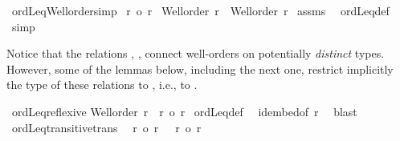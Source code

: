 \begin{isabellebody}
\isanewline
{}\isamarkupfalse%
\ ordLeq{\isacharunderscore}{\kern0pt}Well{\isacharunderscore}{\kern0pt}order{\isacharunderscore}{\kern0pt}simp{\isacharcolon}{\kern0pt}\isanewline
{}\ {\isachardoublequoteopen}r\ {\isasymle}o\ r{\isacharprime}{\kern0pt}{\isachardoublequoteclose}\isanewline
{}\ {\isachardoublequoteopen}Well{\isacharunderscore}{\kern0pt}order\ r\ {\isasymand}\ Well{\isacharunderscore}{\kern0pt}order\ r{\isacharprime}{\kern0pt}{\isachardoublequoteclose}\isanewline
%
\isadelimproof
%
\endisadelimproof
%
\isatagproof
{}\isamarkupfalse%
\ assms\ \isamarkupfalse%
\ ordLeq{\isacharunderscore}{\kern0pt}def\ \isamarkupfalse%
\ simp%
\endisatagproof
{\isafoldproof}%
%
\isadelimproof
%
\endisadelimproof
%
\begin{isamarkuptext}%
Notice that the relations , ,  connect well-orders
on potentially {\em distinct} types. However, some of the lemmas below, including the next one,
restrict implicitly the type of these relations to  , i.e.,
to .%
\end{isamarkuptext}\isamarkuptrue%
\isamarkupfalse%
\ ordLeq{\isacharunderscore}{\kern0pt}reflexive{\isacharcolon}{\kern0pt}\isanewline
{\isachardoublequoteopen}Well{\isacharunderscore}{\kern0pt}order\ r\ {\isasymLongrightarrow}\ r\ {\isasymle}o\ r{\isachardoublequoteclose}\isanewline
%
\isadelimproof
%
\endisadelimproof
%
\isatagproof
{}\isamarkupfalse%
\ ordLeq{\isacharunderscore}{\kern0pt}def\ \isamarkupfalse%
\ id{\isacharunderscore}{\kern0pt}embed{\isacharbrackleft}{\kern0pt}of\ r{\isacharbrackright}{\kern0pt}\ \isamarkupfalse%
\ blast%
\endisatagproof
{\isafoldproof}%
%
\isadelimproof
\isanewline
%
\endisadelimproof
\isanewline
{}\isamarkupfalse%
\ ordLeq{\isacharunderscore}{\kern0pt}transitive{\isacharbrackleft}{\kern0pt}trans{\isacharbrackright}{\kern0pt}{\isacharcolon}{\kern0pt}\isanewline
{}\ {\isacharasterisk}{\kern0pt}{\isacharcolon}{\kern0pt}\ {\isachardoublequoteopen}r\ {\isasymle}o\ r{\isacharprime}{\kern0pt}{\isachardoublequoteclose}\ \ {\isacharasterisk}{\kern0pt}{\isacharasterisk}{\kern0pt}{\isacharcolon}{\kern0pt}\ {\isachardoublequoteopen}r{\isacharprime}{\kern0pt}\ {\isasymle}o\ r{\isacharprime}{\kern0pt}{\isacharprime}{\kern0pt}{\isachardoublequoteclose}\isanewline

\end{isabellebody}
